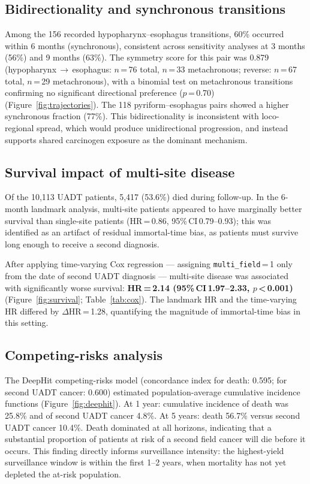 \documentclass[12pt,a4paper]{article}
\begin{document}
\subsection{Bidirectionality and synchronous transitions}

Among the 156 recorded hypopharynx--esophagus transitions,
60\% occurred within 6 months (synchronous), consistent across sensitivity
analyses at 3 months (56\%) and 9 months (63\%).
The symmetry score for this pair was 0.879
(hypopharynx\,$\to$\,esophagus: $n$\,=\,76 total, $n$\,=\,33 metachronous;
reverse: $n$\,=\,67 total, $n$\,=\,29 metachronous),
with a binomial test on metachronous transitions confirming no significant
directional preference ($p$\,=\,0.70) (Figure~\ref{fig:trajectories}).
The 118 pyriform--esophagus pairs showed a higher synchronous fraction (77\%).
This bidirectionality is inconsistent with loco-regional spread, which would
produce unidirectional progression, and instead supports shared carcinogen
exposure as the dominant mechanism.

\subsection{Survival impact of multi-site disease}

Of the 10,113 UADT patients, 5,417 (53.6\%) died during follow-up.
In the 6-month landmark analysis, multi-site patients appeared to have
marginally better survival than single-site patients
(HR\,=\,0.86, 95\%\,CI\,0.79--0.93); this was identified as an artifact of
residual immortal-time bias, as patients must survive long enough to receive a
second diagnosis.

After applying time-varying Cox regression — assigning \texttt{multi\_field}\,=\,1
only from the date of second UADT diagnosis — multi-site disease was associated
with significantly worse survival:
\textbf{HR\,=\,2.14 (95\%\,CI\,1.97--2.33, $p$\,<\,0.001)}
(Figure~\ref{fig:survival}; Table~\ref{tab:cox}).
The landmark HR and the time-varying HR differed by $\Delta$HR\,=\,1.28,
quantifying the magnitude of immortal-time bias in this setting.

\subsection{Competing-risks analysis}

The DeepHit competing-risks model (concordance index for death: 0.595;
for second UADT cancer: 0.600) estimated population-average cumulative incidence
functions (Figure~\ref{fig:deephit}).
At 1 year: cumulative incidence of death was 25.8\% and of second UADT cancer 4.8\%.
At 5 years: death 56.7\% versus second UADT cancer 10.4\%.
Death dominated at all horizons, indicating that a substantial proportion of
patients at risk of a second field cancer will die before it occurs.
This finding directly informs surveillance intensity: the highest-yield
surveillance window is within the first 1--2 years, when mortality has not yet
depleted the at-risk population.
\end{document}
